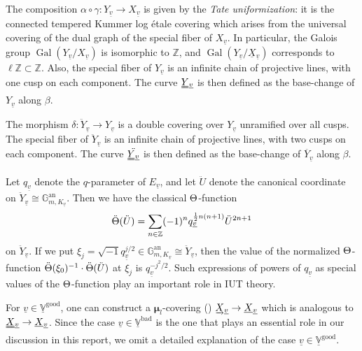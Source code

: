 \documentclass[12pt, reqno, a4paper]{amsart}
\def\udl#1{\underline{#1}} %
\def\uudl#1{\uuline{#1}} %
\def\bZ{\mathbb{Z}} %
\def\bV{\mathbb{V}}
\def\uX{\udl{X}} %
\def\uV{\udl{\bV}} %
\def\uv{\udl{v}} %
\def\uuX{\uudl{X}{}} %
\def\uuY{\uudl{Y}{}} %
\def\uaX{\underscriptrightarrow{X}} %
\def\bmu{\bm{\mu}}
\def\bad{\mathrm{bad}}
\def\good{\mathrm{good}}
\DeclareMathOperator{\Gal}{Gal}
\begin{document}
The composition $\alpha\circ\gamma\colon Y_{\uv}\to X_{\uv}$ is given by the \emph{Tate uniformization}: it is the connected tempered Kummer log \'etale covering which arises from the universal covering of the dual graph of the special fiber of $X_{\uv}$.
In particular, the Galois group $\Gal(Y_{\uv}/X_{\uv})$ is isomorphic to $\bZ$, and $\Gal(Y_{\uv}/\uX{}_{\uv})$ corresponds to $\ell\bZ\subset \bZ$.
Also, the special fiber of $Y_{\uv}$ is an infinite chain of projective lines, with one cusp on each component.
The curve $\uuY{}_{\uv}$ is then defined as the base-change of $Y_{\uv}$ along $\beta$.

The morphism $\delta\colon \ddot{Y}_{\uv}\to Y_{\uv}$ is a double covering over $Y_{\uv}$ unramified over all cusps.
The special fiber of $\ddot{Y}_{\uv}$ is an infinite chain of projective lines, with two cusps on each component.
The curve $\ddot{\uuY{}_{\uv}}$ is then defined as the base-change of $\ddot{Y_{\uv}}$ along $\beta$.

Let $q_{\uv}$ denote the $q$-parameter of $E_{\uv}$, and let $\ddot{U}$ denote the canonical coordinate on $\ddot{Y}_{\uv}\cong\mathbb{G}_{m,K_{\uv}}^{\mathrm{an}}$.
Then we have the classical $\Th$-function
\begin{equation}\label{eqn:classicalThetaFunction}
\ddot{\Th}(\ddot{U})=\sum_{n\in \bZ}(-1)^nq_{\uv}^{\frac{1}{2}n(n+1)}\ddot{U}^{2n+1}
\end{equation}
on $\ddot{Y}_{\uv}$.
If we put $\xi_j=\sqrt{-1}q_{\uv}^{j/2}\in \mathbb{G}_{m,K_{\uv}}^{\mathrm{an}}\cong\ddot{Y}_{\uv}$, then the value of the normalized $\Th$-function $\ddot{\Th}(\xi_0)^{-1}\cdot\ddot{\Th}(\ddot{U})$ at $\xi_j$ is $q_{\uv}^{-j^2/2}$. Such expressions of powers of $q_{\uv}$ as special values of the $\Th$-function play an important role in IUT theory.

For $\uv\in \uV^{\good}$, one can construct a $\bmu_l$-covering (\cite[Def.\ 1.1, p.\ 44]{MR4225473}) $\uaX{}_{\uv}\to\uX{}_{\uv}$ which is analogous to $\uuX{}_{\uv}\to\uX{}_{\uv}$.
Since the case $\uv\in \uV^{\bad}$ is the one that plays an essential role in our discussion in this report, we omit a detailed explanation of the case $\uv\in \uV^{\good}$.
\end{document}
